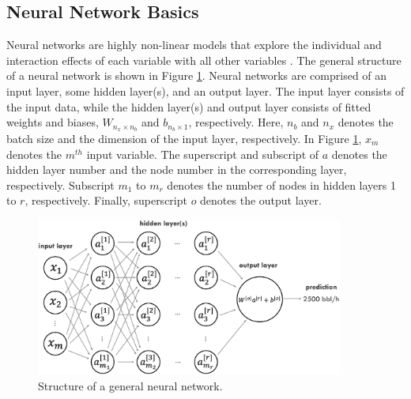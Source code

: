 \subsection{Neural Network Basics}
Neural networks are highly non-linear models that explore the individual and interaction effects of each variable with all other variables \cite{NN}. The general structure of a neural network is shown in Figure \ref{fig:08NN}.  Neural networks are comprised of an input layer, some hidden layer(s), and an output layer.  The input layer consists of the input data, while the hidden layer(s) and output layer consists of fitted weights and biases, $W_{n_x \times n_b}$ and $b_{n_b \times 1}$, respectively. Here, $n_b$ and $n_x$ denotes the batch size and the dimension of the input layer, respectively. In Figure \ref{fig:08NN}, $x_m$ denotes the $m^{th}$ input variable.  The superscript and subscript of $a$ denotes the hidden layer number and the node number in the corresponding layer, respectively.  Subscript $m_1$ to $m_r$ denotes the number of nodes in hidden layers 1 to $r$, respectively.  Finally, superscript $o$ denotes the output layer.
\begin{figure}[h]
    \centering
    \includegraphics[width=0.9\textwidth]{images/ch1/08NN.png}
    \caption{Structure of a general neural network.}
    \label{fig:08NN}
\end{figure}


